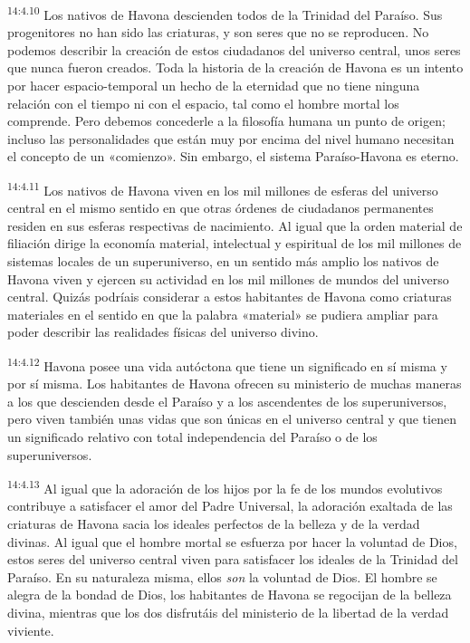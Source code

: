 \par
\textsuperscript{14:4.10} Los nativos de Havona descienden todos de la Trinidad del Paraíso. Sus progenitores no han sido las criaturas, y son seres que no se reproducen. No podemos describir la creación de estos ciudadanos del universo central, unos seres que nunca fueron creados. Toda la historia de la creación de Havona es un intento por hacer espacio-temporal un hecho de la eternidad que no tiene ninguna relación con el tiempo ni con el espacio, tal como el hombre mortal los comprende. Pero debemos concederle a la filosofía humana un punto de origen; incluso las personalidades que están muy por encima del nivel humano necesitan el concepto de un «comienzo». Sin embargo, el sistema Paraíso-Havona es eterno.

\par
\textsuperscript{14:4.11} Los nativos de Havona viven en los mil millones de esferas del universo central en el mismo sentido en que otras órdenes de ciudadanos permanentes residen en sus esferas respectivas de nacimiento. Al igual que la orden material de filiación dirige la economía material, intelectual y espiritual de los mil millones de sistemas locales de un superuniverso, en un sentido más amplio los nativos de Havona viven y ejercen su actividad en los mil millones de mundos del universo central. Quizás podríais considerar a estos habitantes de Havona como criaturas materiales en el sentido en que la palabra «material» se pudiera ampliar para poder describir las realidades físicas del universo divino.

\par
\textsuperscript{14:4.12} Havona posee una vida autóctona que tiene un significado en sí misma y por sí misma. Los habitantes de Havona ofrecen su ministerio de muchas maneras a los que descienden desde el Paraíso y a los ascendentes de los superuniversos, pero viven también unas vidas que son únicas en el universo central y que tienen un significado relativo con total independencia del Paraíso o de los superuniversos.

\par
\textsuperscript{14:4.13} Al igual que la adoración de los hijos por la fe de los mundos evolutivos contribuye a satisfacer el amor del Padre Universal, la adoración exaltada de las criaturas de Havona sacia los ideales perfectos de la belleza y de la verdad divinas. Al igual que el hombre mortal se esfuerza por hacer la voluntad de Dios, estos seres del universo central viven para satisfacer los ideales de la Trinidad del Paraíso. En su naturaleza misma, ellos \textit{son} la voluntad de Dios. El hombre se alegra de la bondad de Dios, los habitantes de Havona se regocijan de la belleza divina, mientras que los dos disfrutáis del ministerio de la libertad de la verdad viviente.

